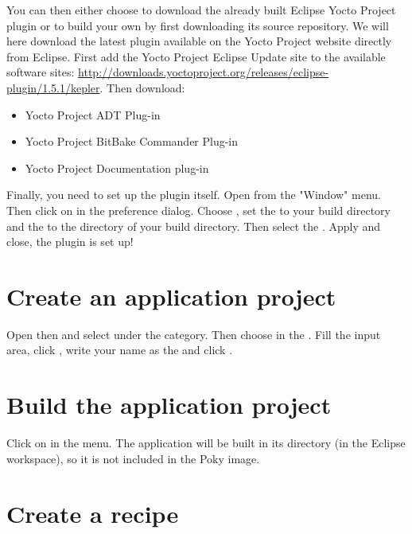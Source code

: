 You can then either choose to download the already built Eclipse Yocto Project
plugin or to build your own by first downloading its source repository. We will
here download the latest plugin available on the Yocto Project website directly
from Eclipse.
First add the Yocto Project Eclipse Update site to the available software sites:
\url{http://downloads.yoctoproject.org/releases/eclipse-plugin/1.5.1/kepler}.
Then download:
\begin{itemize}
  \item Yocto Project ADT Plug-in
  \item Yocto Project BitBake Commander Plug-in
  \item Yocto Project Documentation plug-in
\end{itemize}

Finally, you need to set up the plugin itself. Open  from the
"Window" menu. Then click on  in the preference dialog.
Choose , set the  to your build directory and the  to the
 directory of your build directory. Then select the
. Apply and close, the plugin is set up!

\section{Create an application project}

Open  then  and select  under the
 category. Then choose  in the . Fill the
 input area, click , write your name as the
 and click .

\section{Build the application project}

Click on  in the  menu. The application will
be built in its directory (in the Eclipse workspace), so it is not included in
the Poky image.

\section{Create a recipe}

